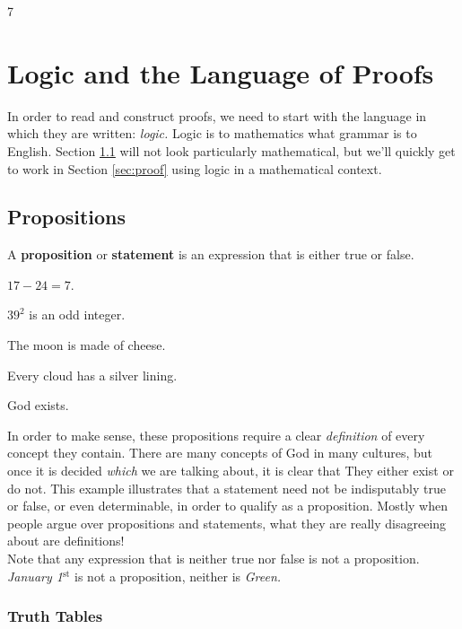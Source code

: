 7\section{Logic and the Language of Proofs}\label{sec:logic}

In order to read and construct proofs, we need to start with the language in which they are written: \emph{logic.} Logic is to mathematics what grammar is to English. Section \ref{sec:prop} will not look particularly mathematical, but we'll quickly get to work in Section \ref{sec:proof} using logic in a mathematical context.

\subsection{Propositions}\label{sec:prop}

\begin{defn}
A \textbf{proposition} or \textbf{statement} is an expression that is either true or false.
\end{defn}

\begin{examples}\itemsep0pt
	\item $17-24=7$.
	\item $39^2$ is an odd integer.
	\item The moon is made of cheese.
	\item Every cloud has a silver lining.
	\item God exists.
\end{examples}

\noindent In order to make sense, these propositions require a clear \emph{definition} of every concept they contain. There are many concepts of God in many cultures, but once it is decided \emph{which} we are talking about, it is clear that They either exist or do not. This example illustrates that a statement need not be indisputably true or false, or even determinable, in order to qualify as a proposition. Mostly when people argue over propositions and statements, what they are really disagreeing about are definitions!\\
Note that any expression that is neither true nor false is not a proposition. \emph{January 1$^{\text{st}}$} is not a proposition, neither is \emph{Green.}

\subsubsection*{Truth Tables}

